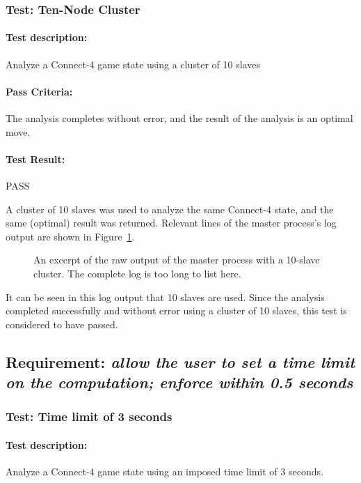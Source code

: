 \documentclass[pdftex,12pt,a4paper]{article}
\begin{document}
\subsubsection{\textbf{Test:} Ten-Node Cluster}

\paragraph{Test description:} Analyze a Connect-4 game state using a cluster of 10 slaves

\paragraph{Pass Criteria:} The analysis completes without error, and the result of the analysis is an optimal move.

\paragraph{Test Result:} PASS

A cluster of 10 slaves was used to analyze the same Connect-4 state, and the same (optimal) result was returned. Relevant lines of the master process's log output are shown in Figure~\ref{fig:master-3}.

\begin{figure}[h]

\caption{An excerpt of the raw output of the master process with a 10-slave cluster. The complete log is too long to list here.}
\label{fig:master-3}
\end{figure}

It can be seen in this log output that 10 slaves are used. Since the analysis completed successfully and without error using a cluster of 10 slaves, this test is considered to have passed.

\subsection{\textbf{Requirement:} \emph{allow the user to set a time limit on the computation; enforce within 0.5 seconds}}

\subsubsection{\textbf{Test:} Time limit of 3 seconds}

\paragraph{Test description:} Analyze a Connect-4 game state using an imposed time limit of 3 seconds. 
\end{document}
